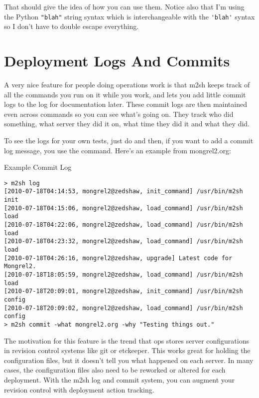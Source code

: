 That should give the idea of how you can use them.  Notice also that I'm using the Python \verb|"blah"| string syntax which is
interchangeable with the \verb|'blah'| syntax so I don't have to double escape everything.


\section{Deployment Logs And Commits}

A very nice feature for people doing operations work is that m2sh keeps track of all the
commands you run on it while you work, and lets you add little commit logs to the
log for documentation later.  These commit logs are then maintained even across
 commands so you can see what's going on.  They
track who did something, what server they did it on, what time they did it and what they
did.

To see the logs for your own tests, just do  and then,
if you want to add a commit log message, you use the  command.
Here's an example from mongrel2.org:

\begin{code}{Example Commit Log}
\begin{lstlisting}
> m2sh log
[2010-07-18T04:14:53, mongrel2@zedshaw, init_command] /usr/bin/m2sh init
[2010-07-18T04:15:06, mongrel2@zedshaw, load_command] /usr/bin/m2sh load
[2010-07-18T04:22:06, mongrel2@zedshaw, load_command] /usr/bin/m2sh load
[2010-07-18T04:23:32, mongrel2@zedshaw, load_command] /usr/bin/m2sh load
[2010-07-18T04:26:16, mongrel2@zedshaw, upgrade] Latest code for Mongrel2.
[2010-07-18T18:05:59, mongrel2@zedshaw, load_command] /usr/bin/m2sh load
[2010-07-18T20:09:01, mongrel2@zedshaw, init_command] /usr/bin/m2sh config
[2010-07-18T20:09:02, mongrel2@zedshaw, load_command] /usr/bin/m2sh config
> m2sh commit -what mongrel2.org -why "Testing things out."
\end{lstlisting}
\end{code}

The motivation for this feature is the trend that ops stores server configurations
in revision control systems like git or etckeeper.  This works great for holding the configuration
files, but it doesn't tell you what happened on each server.  In many cases, the configuration
files also need to be reworked or altered for each deployment.  With the m2sh log and commit
system, you can augment your revision control with deployment action tracking.

